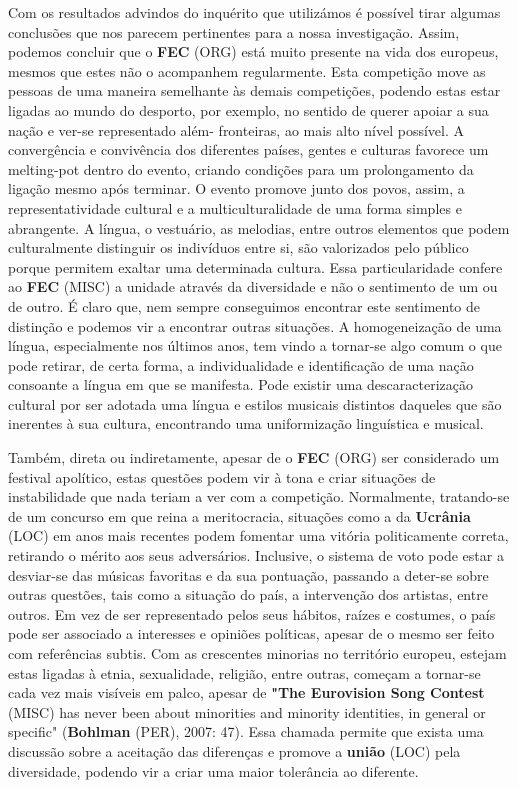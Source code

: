 \documentclass[12pt,a4paper]{article}
\begin{document}
Com os resultados advindos do inquérito que utilizámos é possível tirar algumas conclusões  que  nos  parecem  pertinentes  para  a  nossa  investigação.  Assim,  podemos concluir que o \textbf{FEC} (ORG) está muito presente na vida dos europeus, mesmos que estes não o acompanhem  regularmente.  Esta  competição  move  as  pessoas  de  uma  maneira semelhante às demais competições, podendo estas estar ligadas ao mundo do desporto, por  exemplo,  no  sentido  de  querer  apoiar  a  sua  nação  e  ver-se  representado  além- fronteiras,  ao  mais  alto  nível  possível.  A  convergência  e  convivência  dos  diferentes países, gentes e  culturas  favorece um melting-pot dentro do evento,  criando condições para um prolongamento da ligação mesmo após terminar. O evento promove junto dos povos, assim, a representatividade cultural e a multiculturalidade de uma forma simples e  abrangente.  A  língua,  o  vestuário,  as  melodias,  entre  outros  elementos  que  podem culturalmente  distinguir  os  indivíduos  entre  si,  são  valorizados  pelo  público  porque permitem  exaltar  uma  determinada  cultura.  Essa  particularidade  confere  ao  \textbf{FEC} (MISC)  a unidade através da diversidade e não o sentimento de um ou de outro. É claro que, nem sempre conseguimos encontrar este sentimento de distinção e podemos vir a encontrar outras situações. A homogeneização de uma língua, especialmente nos últimos anos, tem vindo  a  tornar-se  algo  comum  o  que  pode  retirar,  de  certa  forma,  a  individualidade  e identificação de uma nação  consoante  a língua em  que se manifesta. Pode existir uma descaracterização cultural por ser adotada uma língua e estilos musicais distintos daqueles que são inerentes à sua cultura, encontrando uma uniformização linguística e musical.

Também, direta ou indiretamente, apesar de o \textbf{FEC} (ORG)  ser considerado um festival apolítico,  estas  questões  podem  vir  à  tona  e  criar  situações  de  instabilidade  que  nada teriam a ver com a competição. Normalmente, tratando-se de um concurso em que reina a meritocracia, situações como a da \textbf{Ucrânia} (LOC) em anos mais recentes podem fomentar uma vitória politicamente correta, retirando o mérito aos seus adversários. Inclusive, o sistema de  voto  pode  estar  a  desviar-se  das  músicas  favoritas  e  da  sua  pontuação,  passando  a deter-se sobre outras questões, tais como a situação do país, a intervenção dos artistas, entre  outros.  Em  vez  de  ser  representado  pelos  seus  hábitos,  raízes  e  costumes,  o  país pode  ser  associado  a  interesses  e  opiniões  políticas,  apesar  de  o  mesmo  ser  feito  com referências subtis. Com as crescentes minorias no território europeu, estejam estas ligadas à etnia, sexualidade, religião, entre outras, começam a tornar-se cada vez mais visíveis em palco, apesar de \textbf{"The Eurovision Song Contest} (MISC) has never been about minorities and minority identities, in general or specific" (\textbf{Bohlman} (PER), 2007: 47). Essa chamada permite que  exista  uma  discussão  sobre  a  aceitação  das  diferenças  e  promove  a  \textbf{união} (LOC)  pela diversidade, podendo vir a criar uma maior tolerância ao diferente.
\end{document}
